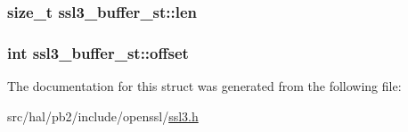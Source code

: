 \subsubsection[{\texorpdfstring{len}{len}}]{\setlength{\rightskip}{0pt plus 5cm}size\+\_\+t ssl3\+\_\+buffer\+\_\+st\+::len}\hypertarget{structssl3__buffer__st_adfe7ca1f516b5502e927d8731608085b}{}\label{structssl3__buffer__st_adfe7ca1f516b5502e927d8731608085b}
\subsubsection[{\texorpdfstring{offset}{offset}}]{\setlength{\rightskip}{0pt plus 5cm}int ssl3\+\_\+buffer\+\_\+st\+::offset}\hypertarget{structssl3__buffer__st_a9102947618e368b7454b8f3a32f8bf09}{}\label{structssl3__buffer__st_a9102947618e368b7454b8f3a32f8bf09}


The documentation for this struct was generated from the following file\+:\begin{DoxyCompactItemize}
\item 
src/hal/pb2/include/openssl/\hyperlink{ssl3_8h}{ssl3.\+h}\end{DoxyCompactItemize}
